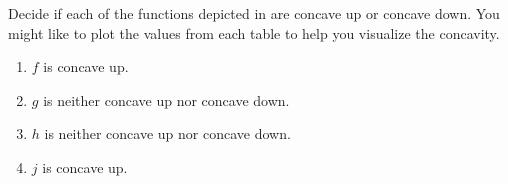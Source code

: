 \begin{exercises}
\begin{problem}
Decide if each of the functions depicted in  
are concave up or concave down. You might like to plot the values 
from each table to help you visualize the concavity.
\begin{shortsolution}
	\begin{enumerate}
		\item $f$ is concave up.
		\item $g$ is neither concave up nor concave down.
		\item $h$ is neither concave up nor concave down.
		\item $j$ is concave up.
	\end{enumerate}
\end{shortsolution}
\end{problem}


\end{exercises}
